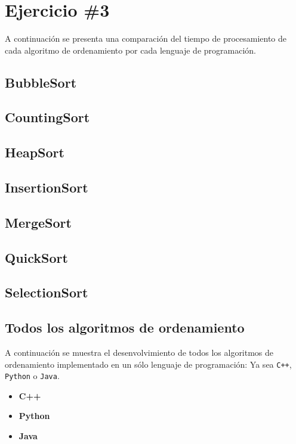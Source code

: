 \section*{Ejercicio \#3}
A continuación se presenta una comparación del tiempo de procesamiento de cada algoritmo de ordenamiento por cada lenguaje de programación.
\subsection*{BubbleSort}
\subsection*{CountingSort}
\subsection*{HeapSort}
\subsection*{InsertionSort}
\subsection*{MergeSort}
\subsection*{QuickSort}
\subsection*{SelectionSort}

\subsection*{Todos los algoritmos de ordenamiento}
A continuación se muestra el desenvolvimiento de todos los algoritmos de ordenamiento implementado en un sólo lenguaje de programación: Ya sea \verb!C++!, \verb!Python! o \verb!Java!.
\begin{itemize}
    \item \textbf{C++}
    \item \textbf{Python}
    \item \textbf{Java}
\end{itemize}

